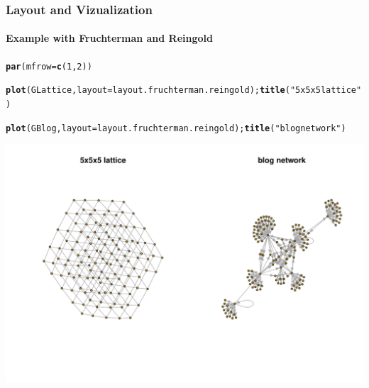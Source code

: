 \documentclass{beamer}\usepackage[]{graphicx}\usepackage[]{color}
\makeatletter
\newcommand{\hlnum}[1]{\textcolor[rgb]{0.686,0.059,0.569}{#1}}%
\newcommand{\hlstr}[1]{\textcolor[rgb]{0.192,0.494,0.8}{#1}}%
\newcommand{\hlstd}[1]{\textcolor[rgb]{0.345,0.345,0.345}{#1}}%
\newcommand{\hlkwc}[1]{\textcolor[rgb]{0.333,0.667,0.333}{#1}}%
\newcommand{\hlkwd}[1]{\textcolor[rgb]{0.737,0.353,0.396}{\textbf{#1}}}%
\newenvironment{kframe}{%
 \def\at@end@of@kframe{}%
 \ifinner\ifhmode%
  \def\at@end@of@kframe{\end{minipage}}%
  \begin{minipage}{\columnwidth}%
 \fi\fi%
 \def\FrameCommand##1{\hskip\@totalleftmargin \hskip-\fboxsep
 \colorbox{shadecolor}{##1}\hskip-\fboxsep
     \hskip-\linewidth \hskip-\@totalleftmargin \hskip\columnwidth}%
 \MakeFramed {\advance\hsize-\width
   \@totalleftmargin\z@ \linewidth\hsize
   \@setminipage}}%
 {\par\unskip\endMakeFramed%
 \at@end@of@kframe}
\newenvironment{knitrout}{}{} %
\makeatother
\begin{document}
\begin{frame}
  \frametitle{Layout and Vizualization}
  \framesubtitle{Example with Fruchterman and Reingold}

\begin{knitrout}\scriptsize
{}\color{fgcolor}\begin{kframe}
\begin{alltt}
\hlkwd{par}\hlstd{(}\hlkwc{mfrow}\hlstd{=}\hlkwd{c}\hlstd{(}\hlnum{1}\hlstd{,}\hlnum{2}\hlstd{))}

\hlkwd{plot}\hlstd{(GLattice,} \hlkwc{layout}\hlstd{=layout.fruchterman.reingold);} \hlkwd{title}\hlstd{(}\hlstr{"5x5x5 lattice"}\hlstd{)}

\hlkwd{plot}\hlstd{(GBlog   ,} \hlkwc{layout}\hlstd{=layout.fruchterman.reingold);} \hlkwd{title}\hlstd{(}\hlstr{"blog network"}\hlstd{)}
\end{alltt}
\end{kframe}
\includegraphics[width=.8\textwidth]{figures/vizu_4-1} 

\end{knitrout}
  
\end{frame}
\end{document}
